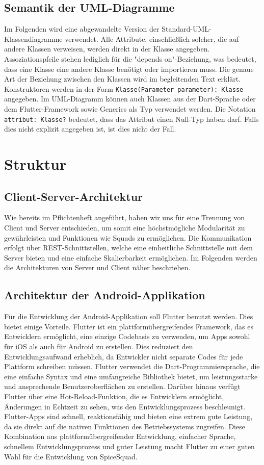 \documentclass[parskip=full]{scrartcl}
\begin{document}
\subsection{Semantik der UML-Diagramme}
Im Folgenden wird eine abgewandelte Version der Standard-UML-Klassendiagramme verwendet. Alle Attribute, einschließlich solcher, die auf andere Klassen verweisen, werden direkt in der Klasse angegeben. Assoziationspfeile stehen lediglich für die "depends on"-Beziehung, was bedeutet, dass eine Klasse eine andere Klasse benötigt oder importieren muss. Die genaue Art der Beziehung zwischen den Klassen wird im begleitenden Text erklärt. Konstruktoren werden in der Form \texttt{Klasse(Parameter parameter): Klasse} angegeben. Im UML-Diagramm können auch Klassen aus der Dart-Sprache oder dem Flutter-Framework sowie Generics als Typ verwendet werden. Die Notation \texttt{attribut: Klasse?} bedeutet, dass das Attribut einen Null-Typ haben darf. Falls dies nicht explizit angegeben ist, ist dies nicht der Fall.

\section{Struktur}

\subsection{Client-Server-Architektur}
Wie bereits im Pflichtenheft angeführt, haben wir uns für eine Trennung von Client und Server entschieden, um somit eine höchstmögliche Modularität zu gewährleisten und
Funktionen wie Squads zu ermöglichen. Die Kommunikation erfolgt über REST-Schnittstellen, welche eine einheitliche Schnittstelle mit dem Server bieten und eine einfache Skalierbarkeit ermöglichen.
Im Folgenden werden die Architekturen von Server und Client näher beschrieben.

\subsection{Architektur der Android-Applikation}
Für die Entwicklung der Android-Applikation soll Flutter benutzt werden. Dies bietet einige Vorteile. Flutter ist ein plattformübergreifendes Framework, das es Entwicklern ermöglicht, eine einzige Codebasis zu verwenden, um Apps sowohl für iOS als auch für Android zu erstellen. Dies reduziert den Entwicklungsaufwand erheblich, da Entwickler nicht separate Codes für jede Plattform schreiben müssen. Flutter verwendet die Dart-Programmiersprache, die eine einfache Syntax und eine umfangreiche Bibliothek bietet, um leistungsstarke und ansprechende Benutzeroberflächen zu erstellen. Darüber hinaus verfügt Flutter über eine Hot-Reload-Funktion, die es Entwicklern ermöglicht, Änderungen in Echtzeit zu sehen, was den Entwicklungsprozess beschleunigt. Flutter-Apps sind schnell, reaktionsfähig und bieten eine extrem gute Leistung, da sie direkt auf die nativen Funktionen des Betriebssystems zugreifen. Diese Kombination aus plattformübergreifender Entwicklung, einfacher Sprache, schnellem Entwicklungsprozess und guter Leistung macht Flutter zu einer guten Wahl für die Entwicklung von SpiceSquad.
\end{document}

